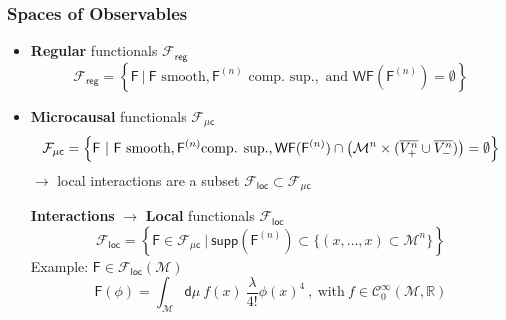 \documentclass[9pt]{beamer}
\newcommand{\WF}{\mathsf{WF}} %
\newcommand{\supp}{\mathsf{supp}} %
\newcommand{\Ccal}{\mathcal{C}}
\newcommand{\Fcal}{\mathcal{F}}
\newcommand{\Mcal}{\mathcal{M}}
\newcommand{\Rbb}{\mathbb{R}}
\newcommand{\Fsf}{\mathsf{F}}
\newcommand{\csf}{\mathsf{c}}
\newcommand{\dsf}{\mathsf{d}}
\begin{document}

\begin{frame}[label=wf]

  \frametitle{Spaces of Observables}

\hfill \hyperlink{details_wf}{}

\vspace*{-10pt}

\begin{itemize}
 
 
 \item \textbf{Regular} functionals $\Fcal_{\mathsf{reg}}$ \\[-12pt]   
    \begin{equation*}
      \Fcal_{\mathsf{reg}} = \left\{ \Fsf \ | \ \Fsf \mbox{ smooth}, \Fsf^{(n)} \mbox{ comp. sup.}, \mbox{ and } \WF(\Fsf^{(n)}) = \emptyset \right\} 
    \end{equation*}
    

  
  \item \textbf{Microcausal} functionals $\Fcal_{\mu\csf}$ \\[-24pt]    
  \begin{equation*}
    \Fcal_{\mu\csf} = \left\{ \Fsf \ | \ \Fsf \mbox{ smooth}, \Fsf^{(n)} \mbox{comp. sup.}, \WF(\Fsf^{(n)}) \cap \left( \Mcal^n \times ( \overline{V^{n}_{+}} \cup \overline{V^{n}_{-}} ) \right)  = \emptyset \right\} 
    \vspace*{-8pt}
  \end{equation*}
  \hspace*{15pt} $\to$ local interactions are a subset $\Fcal_{\mathsf{loc}} \subset \Fcal_{\mu\csf}$ 
  
  \vspace*{14pt}
  
  \hspace*{2pt}%
  \textbf{Interactions} $\to$ \textbf{Local} functionals $\Fcal_{\mathsf{loc}}$ \\[-12pt]
  \begin{equation*}
    \Fcal_{\mathsf{loc}} = \left\{ \Fsf \in \Fcal_{\mu\csf} \ | \ \supp(\Fsf^{(n)}) \subset \{ (x,\dots,x) \subset \Mcal^n \} \right\}
  \end{equation*}
  \hspace*{2pt}%
  Example: $\Fsf \in \Fcal_\mathsf{loc}(\Mcal)$
  \vspace*{-2pt}
  \begin{equation*}
    \Fsf(\phi) = \int_\Mcal \dsf\mu \ f(x) \ \frac{\lambda}{4!} \phi(x)^4 \ , \ \mbox{with} \ f \in \Ccal^\infty_0(\Mcal,\Rbb)
  \end{equation*}

  \end{itemize}

\end{frame}
\end{document}
